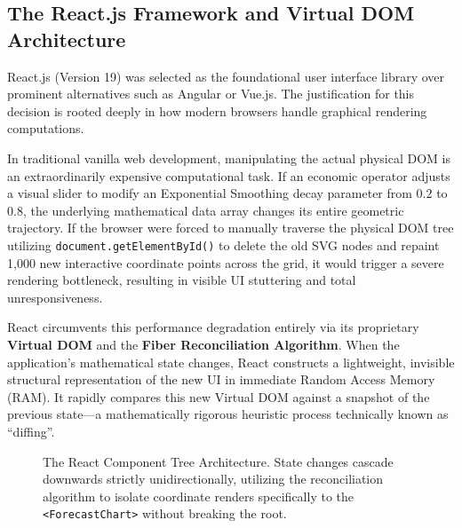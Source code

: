 \subsection{The React.js Framework and Virtual DOM Architecture}
React.js (Version 19) was selected as the foundational user interface library over prominent alternatives such as Angular or Vue.js. The justification for this decision is rooted deeply in how modern browsers handle graphical rendering computations.

In traditional vanilla web development, manipulating the actual physical DOM is an extraordinarily expensive computational task. If an economic operator adjusts a visual slider to modify an Exponential Smoothing decay parameter from $0.2$ to $0.8$, the underlying mathematical data array changes its entire geometric trajectory. If the browser were forced to manually traverse the physical DOM tree utilizing \texttt{document.getElementById()} to delete the old SVG nodes and repaint 1,000 new interactive coordinate points across the grid, it would trigger a severe rendering bottleneck, resulting in visible UI stuttering and total unresponsiveness. 

React circumvents this performance degradation entirely via its proprietary \textbf{Virtual DOM} and the \textbf{Fiber Reconciliation Algorithm}. When the application’s mathematical state changes, React constructs a lightweight, invisible structural representation of the new UI in immediate Random Access Memory (RAM). It rapidly compares this new Virtual DOM against a snapshot of the previous state—a mathematically rigorous heuristic process technically known as ``diffing''. 

\begin{figure}[H]
\centering
{}
\caption{The React Component Tree Architecture. State changes cascade downwards strictly unidirectionally, utilizing the reconciliation algorithm to isolate coordinate renders specifically to the \texttt{<ForecastChart>} without breaking the root.}
\label{fig:react_tree}
\end{figure}

